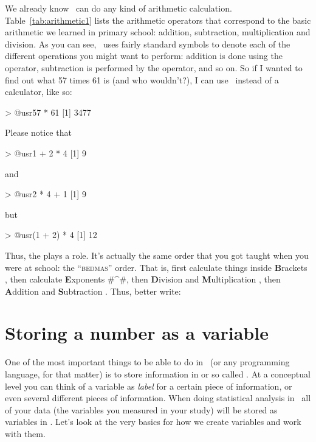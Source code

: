 We already know \R\ can do any kind of arithmetic calculation.  Table~\ref{tab:arithmetic1} lists the arithmetic operators that correspond to the basic arithmetic we learned in primary school: addition, subtraction, multiplication and division. As you can see, \R\ uses fairly standard symbols to denote each of the different operations you might want to perform: addition is done using the \rtext{+} operator, subtraction is performed by the \rtext{-} operator, and so on. So if I wanted to find out what 57 times 61 is (and who wouldn't?), I can use \R\ instead of a calculator, like so:
\begin{rblock1}
> @usr{57 * 61}
[1] 3477
\end{rblock1}

Please notice that
\begin{rblock1}
> @usr{1 + 2 * 4}
[1] 9
\end{rblock1}
and 
\begin{rblock1}
> @usr{2 * 4 + 1}
[1] 9
\end{rblock1}
but
\begin{rblock1}
> @usr{(1 + 2) * 4} 
[1] 12
\end{rblock1}
Thus, the  plays a role. It's actually the same order that you got taught when you were at school: the ``\textsc{bedmas}'' order. That is, first calculate things inside {\bf B}rackets \rtext{()}, then calculate {\bf E}xponents \rtextverb#^#, then {\bf D}ivision \rtext{/} and {\bf M}ultiplication \rtext{*}, then {\bf A}ddition \rtext{+} and {\bf S}ubtraction \rtext{-}. Thus, better write:





\section{Storing a number as a variable~\label{sec:assign}}

One of the most important things to be able to do in \R\ (or any programming language, for that matter) is to store information in  or so called . At a conceptual level you can think of a variable as {\it label} for a certain piece of information, or even several different pieces of information. When doing statistical analysis in \R\ all of your data (the variables you measured in your study) will be stored as variables in \R. Let's look at the very basics for how we create variables and work with them. 

